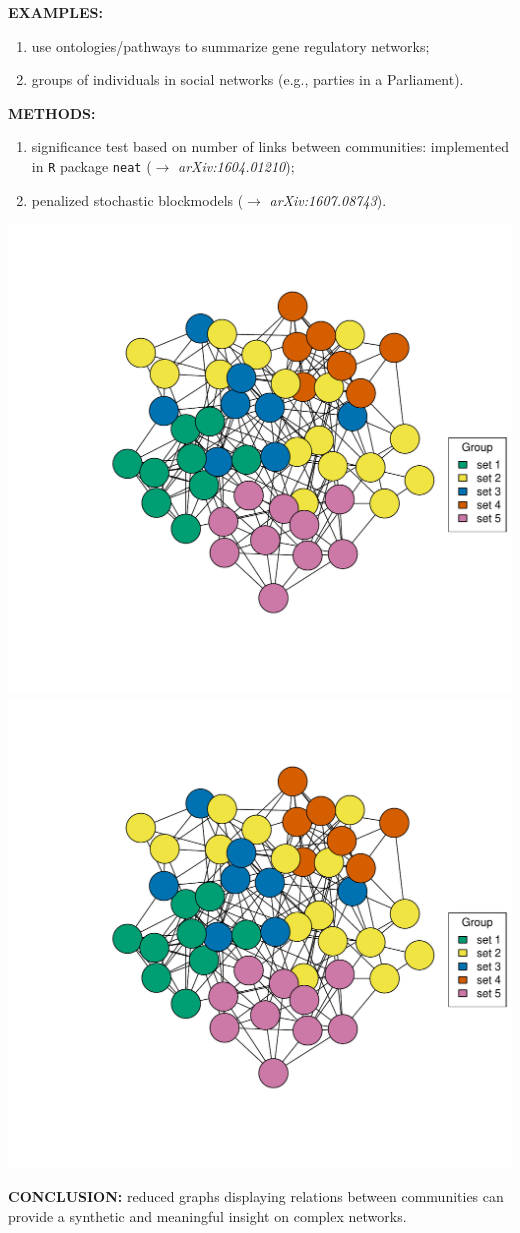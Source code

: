 \documentclass[a0paper,portrait]{baposter}
\begin{document}
\begin{poster}
{	\vspace{0.1cm}
	\textbf{EXAMPLES:}\\\vspace{-0.65cm}
	\begin{enumerate}
		\itemsep-3pt
		\item use ontologies/pathways to summarize gene regulatory networks;
		\item groups of individuals in social networks \small{(e.g., parties in a Parliament)}.
	\end{enumerate}\vspace{-0.1cm}
	\textbf{METHODS:}\\\vspace{-0.65cm}
	\begin{enumerate}
		\itemsep-3pt
		\item significance test based on number of links between communities: implemented in \texttt{R} package \texttt{neat} ($\rightarrow$ \textit{arXiv:1604.01210});
		\item penalized stochastic blockmodels ($\rightarrow$ \textit{arXiv:1607.08743}).
	\end{enumerate}
	\begin{center}
		\includegraphics[width=0.37\linewidth, page=1, trim=0cm 3cm 0cm 3cm]{example-mirko.pdf}
		\includegraphics[width=0.37\linewidth, page=2, trim=0cm 3cm 0cm 3cm]{example-mirko.pdf}
	\end{center}
	\vspace{-0.3cm}
	\textbf{CONCLUSION:} reduced graphs displaying relations between communities can provide a synthetic and meaningful insight on complex networks.
	
}
\end{poster}
\end{document}
